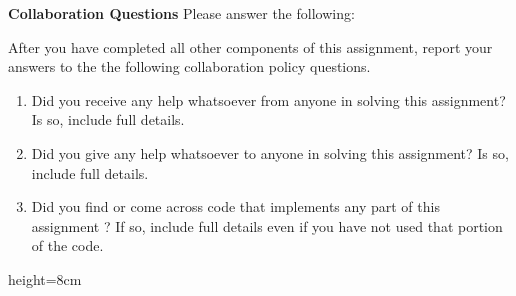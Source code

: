 \textbf{Collaboration Questions} Please answer the following:


    After you have completed all other components of this assignment, report your answers to the the following collaboration policy questions.
    \begin{enumerate}
        \item Did you receive any help whatsoever from anyone in solving this assignment? Is so, include full details.
        \item Did you give any help whatsoever to anyone in solving this assignment? Is so, include full details.
        \item Did you find or come across code that implements any part of this assignment ? If so, include full details even if you have not used that portion of the code. 
    \end{enumerate}
    
    \begin{soln}{height=8cm}

    \end{soln}